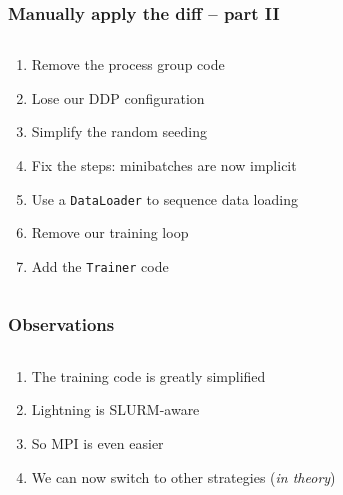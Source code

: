 \documentclass[
	notes=none,
	aspectratio=169
]{beamer}
\begin{document}

\begin{frame}
\frametitle{Manually apply the diff -- part II}

\begin{columns}[T]
\begin{column}[T]{1.0\textwidth}
\setlength{\parskip}{0.5em}

\vspace{0.0cm}
\begin{enumerate}
\setlength{\parskip}{0.0em}
\setcounter{enumi}{8}
\item Remove the process group code
\item Lose our DDP configuration
\item Simplify the random seeding
\item Fix the steps: minibatches are now implicit
\item Use a {\tt DataLoader} to sequence data loading
\item Remove our training loop
\item Add the {\tt Trainer} code
\end{enumerate}

\end{column}
\end{columns}

\end{frame}
\note{
}


\begin{frame}
\frametitle{Observations}

\begin{columns}[T]
\begin{column}[T]{1.0\textwidth}
\setlength{\parskip}{0.5em}

\vspace{0.0cm}
\begin{enumerate}
\setlength{\parskip}{0.5em}
\item The training code is greatly simplified
\item Lightning is SLURM-aware
\item So MPI is even easier
\item We can now switch to other strategies ({\it in theory})
\end{enumerate}

\end{column}
\end{columns}

\end{frame}
\note{
}
\end{document}

